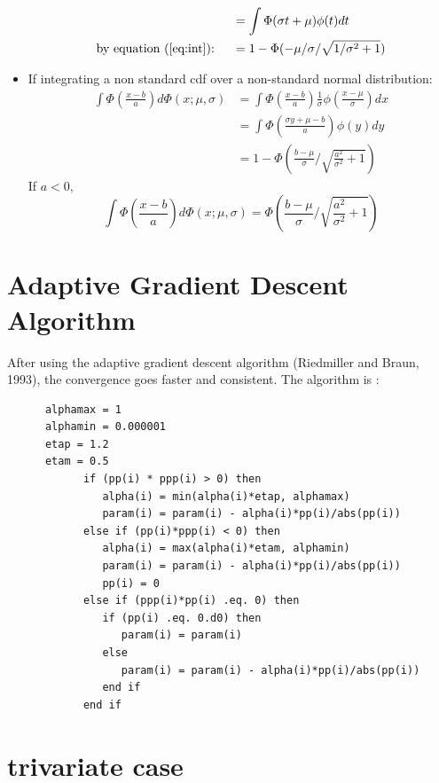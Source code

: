 \documentclass[12pt]{article}
\begin{document}
\begin{itemize}
\begin{align*}
    & = \int \Phi(\sigma t + \mu)\phi(t) dt \\
    \text{by equation (\ref{eq:int}): } \quad & = 1 -
    \Phi(-\mu/\sigma/\sqrt{1/\sigma^2+1})
  \end{align*}
\item If integrating a non standard cdf over a non-standard normal
  distribution:
  \begin{align}
    \int \Phi \left( \frac{x-b}{a} \right) d\Phi(x; \mu, \sigma) & = \int \Phi \left( \frac{x-b}{a} \right) \frac{1}{\sigma} \phi \left( \frac{x-\mu}{\sigma} \right) dx \nonumber\\
    &= \int \Phi \left( \frac{\sigma y + \mu - b}{a}  \right) \phi(y) dy \nonumber \\
    \label{eq:intg1}
    & = 1- \Phi \left( \frac{b-\mu}{\sigma} / \sqrt{\frac{a^2}{\sigma^2}+1} \right)
  \end{align}
  If $a < 0$,
  \begin{equation}
    \label{eq:intg2}
    \int \Phi \left( \frac{x-b}{a} \right) d\Phi(x; \mu, \sigma) = \Phi \left( \frac{b-\mu}{\sigma} / \sqrt{\frac{a^2}{\sigma^2}+1} \right)
  \end{equation}

\end{itemize}

\section{Adaptive Gradient Descent Algorithm}
\label{sec:adapt}
After using the adaptive gradient descent algorithm (Riedmiller and
Braun, 1993), the convergence goes faster and consistent. The
algorithm is :
\begin{verbatim}
      alphamax = 1
      alphamin = 0.000001
      etap = 1.2
      etam = 0.5
            if (pp(i) * ppp(i) > 0) then
               alpha(i) = min(alpha(i)*etap, alphamax)
               param(i) = param(i) - alpha(i)*pp(i)/abs(pp(i))
            else if (pp(i)*ppp(i) < 0) then
               alpha(i) = max(alpha(i)*etam, alphamin)
               param(i) = param(i) - alpha(i)*pp(i)/abs(pp(i))
               pp(i) = 0
            else if (ppp(i)*pp(i) .eq. 0) then
               if (pp(i) .eq. 0.d0) then
                  param(i) = param(i) 
               else
                  param(i) = param(i) - alpha(i)*pp(i)/abs(pp(i))
               end if
            end if
\end{verbatim}

\section{trivariate case}
\end{document}
